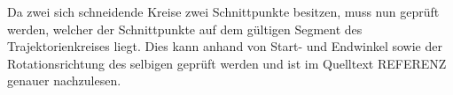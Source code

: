 Da zwei sich schneidende Kreise zwei Schnittpunkte besitzen, muss nun geprüft werden,  welcher der Schnittpunkte auf dem gültigen Segment des Trajektorienkreises liegt. Dies kann anhand von Start- und Endwinkel sowie der Rotationsrichtung des selbigen geprüft werden und ist im Quelltext REFERENZ genauer nachzulesen.

